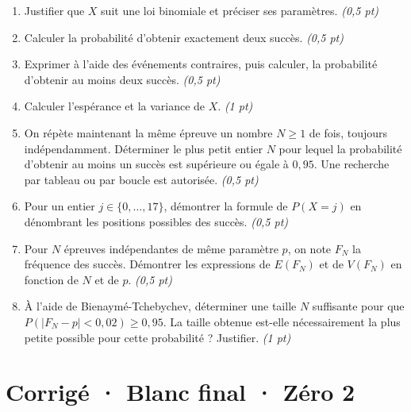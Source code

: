 \begin{enumerate}

\item Justifier que $X$ suit une loi binomiale et préciser ses paramètres. \hfill\textit{(0,5 pt)}

\item Calculer la probabilité d'obtenir exactement deux succès. \hfill\textit{(0,5 pt)}

\item Exprimer à l'aide des événements contraires, puis calculer, la probabilité d'obtenir au moins deux succès. \hfill\textit{(0,5 pt)}

\item Calculer l'espérance et la variance de $X$. \hfill\textit{(1 pt)}

\item On répète maintenant la même épreuve un nombre $N\ge1$ de fois, toujours indépendamment. Déterminer le plus petit entier $N$ pour lequel la probabilité d'obtenir au moins un succès est supérieure ou égale à $0{,}95$. Une recherche par tableau ou par boucle est autorisée. \hfill\textit{(0,5 pt)}

\item Pour un entier $j\in\{0,\ldots,17\}$, démontrer la formule de $P(X=j)$ en dénombrant les positions possibles des succès. \hfill\textit{(0,5 pt)}

\item Pour $N$ épreuves indépendantes de même paramètre $p$, on note $F_N$ la fréquence des succès. Démontrer les expressions de $E(F_N)$ et de $V(F_N)$ en fonction de $N$ et de $p$. \hfill\textit{(0,5 pt)}

\item À l'aide de Bienaymé-Tchebychev, déterminer une taille $N$ suffisante pour que $P(|F_N-p|<0{,}02)\ge0{,}95$. La taille obtenue est-elle nécessairement la plus petite possible pour cette probabilité ? Justifier. \hfill\textit{(1 pt)}

\end{enumerate}

\ifprof\clearpage

\section*{Corrigé · Blanc final · Zéro 2}\label{cor:9-2}


